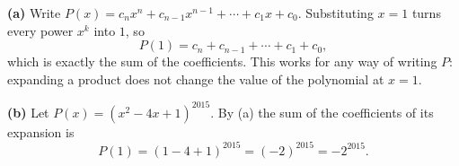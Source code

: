 \textbf{(a)} Write $P(x)=c_nx^n+c_{n-1}x^{n-1}+\cdots+c_1x+c_0$. Substituting $x=1$ turns every power $x^k$ into $1$, so
\[P(1)=c_n+c_{n-1}+\cdots+c_1+c_0,\]
which is exactly the sum of the coefficients. This works for any way of writing $P$: expanding a product does not change the value of the polynomial at $x=1$.

\textbf{(b)} Let $P(x)=\left(x^2-4x+1\right)^{2015}$. By (a) the sum of the coefficients of its expansion is
\[P(1)=(1-4+1)^{2015}=(-2)^{2015}=\boxed{-2^{2015}}.\]
